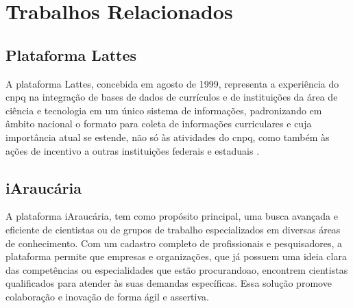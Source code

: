 \chapter{Trabalhos Relacionados}\label{cap:trabalhos:relacionados}

\section{Plataforma Lattes}\label{sec:lattes}

A plataforma Lattes, concebida em agosto de 1999, representa a experiência do \gls{cnpq} na integração de bases de dados de currículos e de instituições da área de ciência e tecnologia em um único sistema de informações, padronizando em âmbito nacional o formato para coleta de informações curriculares e cuja importância atual se estende, não só às atividades do \gls{cnpq}, como também às ações de incentivo a outras instituições federais e estaduais \cite{Lattes}.


\section{iAraucária}\label{sec:iaraucaria}

A plataforma iAraucária, tem como propósito principal, uma busca avançada e eficiente de cientistas ou de grupos de trabalho especializados em diversas áreas de conhecimento. Com um cadastro completo de profissionais e pesquisadores, a plataforma permite que empresas e organizações, que já possuem uma ideia clara das competências ou especialidades que estão procurandoao, encontrem cientistas qualificados para atender às suas demandas específicas. Essa solução promove colaboração e inovação de forma ágil e assertiva.